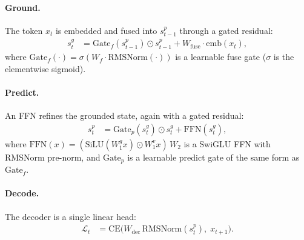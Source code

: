 \documentclass{article}
\begin{document}
\paragraph{Ground.} The token $x_t$ is embedded and fused into
$s^p_{t-1}$ through a gated residual:
\begin{align}
s^g_t &= \text{Gate}_f(s^p_{t-1}) \odot s^p_{t-1}
   + W_{\text{fuse}} \cdot \text{emb}(x_t),
\label{eq:ground-gpn}
\end{align}
where $\text{Gate}_f(\cdot) = \sigma\!\left(W_f \cdot \text{RMSNorm}(\cdot)\right)$
is a learnable fuse gate ($\sigma$ is the elementwise sigmoid).

\paragraph{Predict.} An FFN refines the grounded state, again with a
gated residual:
\begin{align}
s^p_t &= \text{Gate}_p(s^g_t) \odot s^g_t
   + \text{FFN}(s^g_t),
\label{eq:predict-gpn}
\end{align}
where $\text{FFN}(x) = (\text{SiLU}(W_1^g x) \odot W_1^v x)\, W_2$ is
a SwiGLU FFN with RMSNorm pre-norm, and $\text{Gate}_p$ is a
learnable predict gate of the same form as $\text{Gate}_f$.

\paragraph{Decode.} The decoder is a single linear head:
\begin{align}
\mathcal{L}_t &= \text{CE}\big(W_{\text{dec}}\,
   \text{RMSNorm}(s^p_t),\; x_{t+1}\big).
\label{eq:decode-gpn}
\end{align}
\end{document}
